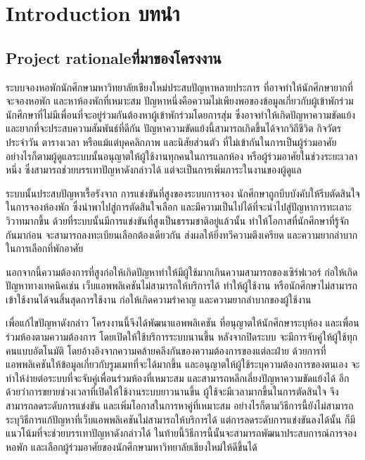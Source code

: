 \chapter{\ifenglish Introduction \else บทนำ\fi}
\section{\ifenglish Project rationale\else ที่มาของโครงงาน\fi}

ระบบจองหอพักนักศึกษามหาวิทยาลัยเชียงใหม่ประสบปัญหาหลายประการ ที่อาจทำให้นักศึกษายากที่จะจองหอพัก 
และหาห้องพักที่เหมาะสม ปัญหาหนึ่งคือความไม่เพียงพอของข้อมูลเกี่ยวกับผู้เข้าพักร่วม 
นักศึกษาที่ไม่มีเพื่อนที่จะอยู่ร่วมกันต้องหาผู้เข้าพักร่วมโดยการสุ่ม ซึ่งอาจทำให้เกิดปัญหาความขัดแย้ง 
และยากที่จะประสบความสัมพันธ์ที่ดีกัน ปัญหาความขัดแย้งนี้สามารถเกิดขึ้นได้จากวิถีชีวิต กิจวัตรประจำวัน 
ตารางเวลา หรือแม้แต่บุคคลิกภาพ และนิสัยส่วนตัว ที่ไม่เข้ากันในการเป็นผู้ร่วมอาศัย
อย่างไรก็ตามผู้ดูแลระบบนั้นอนุญาตให้ผู้ใช้งานทุกคนในการแลกห้อง หรือผู้ร่วมอาศัยในช่วงระยะเวลาหนึ่ง 
ซึ่งสามารถช่วยบรรเทาปัญหาดังกล่าวได้ แต่จะเป็นการเพิ่มภาระในงานของผู้ดูแล

ระบบนั้นประสบปัญหาเรื้อรังจาก การแข่งขันที่สูงของระบบการจอง นักศึกษาถูกบีบบังคับให้รีบตัดสินใจในการจองห้องพัก
ซึ่งนำพาไปสู่การตัดสินใจเลือก และมีความเป็นไปได้ที่จะนำไปสู่ปัญหาการทะเลาะวิวาทมากขึ้น ด้วยที่ระบบนั้นมีการแข่งขันที่สูงเป็นธรรมชาติอยู่แล้วนั้น
ทำให้โอกาสที่นักศึกษาที่รู้จักกันมาก่อน จะสามารถลงทะเบียนเลือกต้องเดียวกัน ส่งผลให้ยิ่งทวีความตึงเครียด
และความยากลำบากในการเลือกที่พักอาศัย

นอกจากนี้ความต้องการที่สูงก่อให้เกิดปัญหาทำให้มีผู้ใช้มากเกินความสามารถของเซิร์ฟเวอร์ ก่อให้เกิดปัญหาทางเทคนิคเช่น 
เว็บแอพพลิเคชันไม่สามารถให้บริการได้ ทำให้ผู้ใช้งาน หรือนักศึกษาไม่สามารถเข้าใช้งานได้จนสิ้นสุดการใช้งาน 
ก่อให้เกิดความรำคาญ และความยากลำบากของผู้ใช้งาน

เพื่อแก้ไขปัญหาดังกล่าว โครงงานนี้จึงได้พัฒนาแอพพลิเคชัน ที่อนุญาตให้นักศึกษาระบุห้อง 
และเพื่อนร่วมห้องตามความต้องการ โดยเปิดให้ใช้บริการระบบนานขึ้น หลังจากปิดระบบ จะมีการจับคู่ให้ผู้ใช้ทุกคนแบบอัตโนมัติ 
โดยอ้างอิงจากความคล้ายคลึงกันของความต้องการของแต่ละฝ่าย
ด้วยการที่แอพพลิเคชันให้ข้อมูลเกี่ยวกับรูมเมทที่จะได้มากขึ้น และอนุญาตให้ผู้ใช้ระบุความต้องการของตนเอง 
จะทำให้ง่ายต่อระบบที่จะจับคู่เพื่อนร่วมห้องที่เหมาะสม และสามารถหลีกเลี่ยงปัญหาความขัดแย้งได้ 
อีกด้วยว่าการขยายช่วงเวลาที่เปิดให้ใช้งานระบบยาวนานขึ้น ผู้ใช้จะมีเวลามากขึ้นในการตัดสินใจ จึงสามารถลดระดับการแข่งขัน 
และเพิ่มโอกาสในการหาคู่ที่เหมาะสม อย่างไรก็ตามวิธีการนี้ยังไม่สามารถระบุวิธีการแก้ปัญหาที่เว็บแอพพลิเคชันไม่สามารถให้บริการได้
แต่การลดระดับการแข่งขันลงได้นั้น ก็มีแนวโน้มที่จะช่วยบรรเทาปัญหาดังกล่าวได้ 
ในท้ายนี้วิธีการนี้นั้นจะสามารถพัฒนาประสบการณ์การจองหอพัก และเลือกผู้ร่วมอาศัยของนักศึกษามหาวิทยาลัยเชียงใหม่ให้ดีขึ้นได้

